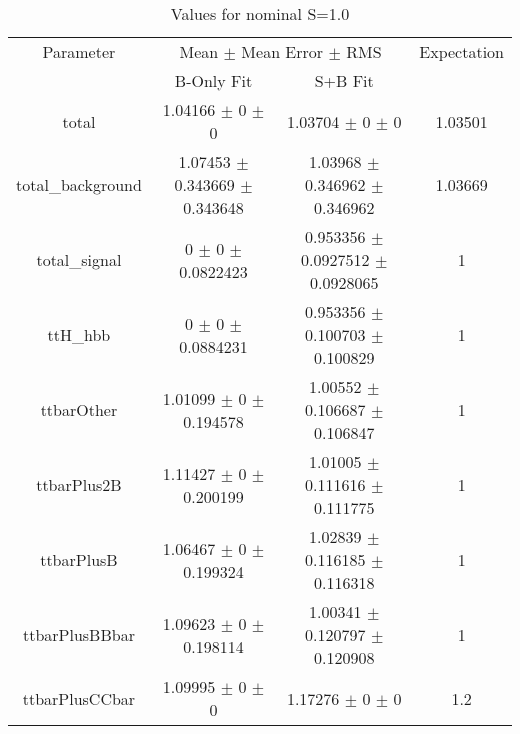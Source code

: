 \begin{table}
\centering
\caption{Values for nominal S=1.0}
\begin{tabular}{cccc}
\toprule
Parameter & \multicolumn{2}{c}{Mean $\pm$ Mean Error $\pm$ RMS} & Expectation\\
 & B-Only Fit & S+B Fit & \\
\midrule
total & \num{1.04166} $\pm$ \num{0} $\pm$ \num{0} & \num{1.03704} $\pm$ \num{0} $\pm$ \num{0} & \num{1.03501}\\
total\_background & \num{1.07453} $\pm$ \num{0.343669} $\pm$ \num{0.343648} & \num{1.03968} $\pm$ \num{0.346962} $\pm$ \num{0.346962} & \num{1.03669}\\
total\_signal & \num{0} $\pm$ \num{0} $\pm$ \num{0.0822423} & \num{0.953356} $\pm$ \num{0.0927512} $\pm$ \num{0.0928065} & \num{1}\\
ttH\_hbb & \num{0} $\pm$ \num{0} $\pm$ \num{0.0884231} & \num{0.953356} $\pm$ \num{0.100703} $\pm$ \num{0.100829} & \num{1}\\
ttbarOther & \num{1.01099} $\pm$ \num{0} $\pm$ \num{0.194578} & \num{1.00552} $\pm$ \num{0.106687} $\pm$ \num{0.106847} & \num{1}\\
ttbarPlus2B & \num{1.11427} $\pm$ \num{0} $\pm$ \num{0.200199} & \num{1.01005} $\pm$ \num{0.111616} $\pm$ \num{0.111775} & \num{1}\\
ttbarPlusB & \num{1.06467} $\pm$ \num{0} $\pm$ \num{0.199324} & \num{1.02839} $\pm$ \num{0.116185} $\pm$ \num{0.116318} & \num{1}\\
ttbarPlusBBbar & \num{1.09623} $\pm$ \num{0} $\pm$ \num{0.198114} & \num{1.00341} $\pm$ \num{0.120797} $\pm$ \num{0.120908} & \num{1}\\
ttbarPlusCCbar & \num{1.09995} $\pm$ \num{0} $\pm$ \num{0} & \num{1.17276} $\pm$ \num{0} $\pm$ \num{0} & \num{1.2}\\
\bottomrule
\end{tabular}
\end{table}